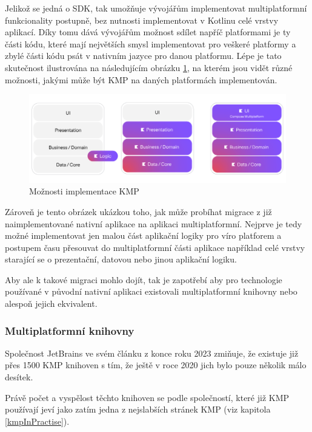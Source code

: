 Jelikož se jedná o SDK, tak umožňuje vývojářům implementovat multiplatformní funkcionality postupně, bez nutnosti implementovat 
v Kotlinu celé vrstvy aplikací. Díky tomu dává vývojářům možnost sdílet napříč platformami je ty části kódu, které mají největších
smysl implementovat pro veškeré platformy a zbylé části kódu psát v nativním jazyce pro danou platformu. \cite{KMP}
Lépe je tato skutečnost ilustrována na následujícím obrázku \ref{fig:KMP_vrstvy}, na kterém jsou vidět různé možnosti,
jakými může být KMP na daných platformách implementován.

\begin{figure}[H]
  \centering
  \includegraphics[width=1\textwidth]{KMP_vrstvy.png}
  \caption{Možnosti implementace KMP}
  \label{fig:KMP_vrstvy}
\end{figure}

Zároveň je tento obrázek ukázkou toho, jak může probíhat migrace z již naimplementované nativní aplikace na aplikaci
multiplatformní. Nejprve je tedy možné implementovat jen malou část aplikační logiky pro víro platforem a postupem času přesouvat
do multiplatformní části aplikace například celé vrstvy starající se o prezentační, datovou nebo jinou aplikační logiku. \cite{KMPUseCases}

Aby ale k takové migraci mohlo dojít, tak je zapotřebí aby pro technologie používané v původní nativní aplikaci existovali multiplatformní
knihovny nebo alespoň jejich ekvivalent.

\subsubsection*{Multiplatformní knihovny}
Společnost JetBrains ve svém článku z konce roku 2023 zmiňuje, že existuje již přes 1500 KMP knihoven s tím, že ještě v roce 2020
jich bylo pouze několik málo desítek. \cite{KMPstable}

Právě počet a vyspělost těchto knihoven se podle společností, které již KMP používají jeví jako zatím jedna z nejslabších stránek KMP (viz kapitola \ref{kmpInPractise}).

